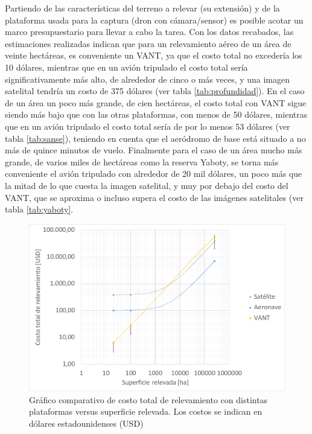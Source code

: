 Partiendo de las características del terreno a relevar (su extensión) y de la plataforma usada para la captura (dron con cámara/sensor) es posible acotar un marco presupuestario para llevar a cabo la tarea. Con los datos recabados, las estimaciones realizadas indican que para un relevamiento aéreo de un área de veinte hectáreas, es conveniente un VANT, ya que el costo total no excedería los 10 dólares, mientras que en un avión tripulado el costo total sería significativamente más alto, de alrededor de cinco o más veces, y una imagen satelital tendría un costo de 375 dólares (ver tabla \ref{tab:profundidad}). En el caso de un área un poco más grande, de cien hectáreas, el costo total con VANT sigue siendo más bajo que con las otras plataformas, con menos de 50 dólares, mientras que en un avión tripulado el costo total sería de por lo menos 53 dólares (ver tabla \ref{tab:sanse}), teniendo en cuenta que el aeródromo de base está situado a no más de quince minutos de vuelo. Finalmente para el caso de un área mucho más grande, de varios miles de hectáreas como la reserva Yaboty, se torna más conveniente el avión tripulado con alrededor de 20 mil dólares, un poco más que la mitad de lo que cuesta la imagen satelital, y muy por debajo del costo del VANT, que se aproxima o incluso supera el costo de las imágenes satelitales (ver tabla \ref{tab:yaboty}.


\begin{figure}[h!]
    \includegraphics[width=\textwidth]{Imagenes/grafico bloque 1.png}
     \hfill
     \caption{Gráfico comparativo de costo total de relevamiento con distintas plataformas versus superficie relevada. Los costos se indican en dólares estadounidenses (USD)}
    \label{grafico_comparativo}
\end{figure}

